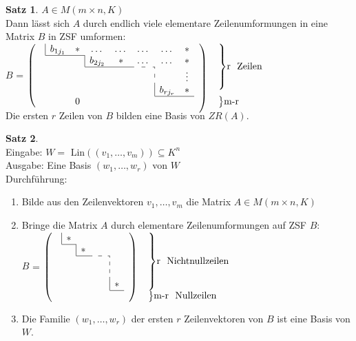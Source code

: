 \documentclass[10pt,a4paper,numbers=endperiod]{scrartcl}
\theoremstyle{definition}
\newtheorem{satz}{Satz}[section]
\begin{document}
\begin{satz}
	$A \in M(m\times n, K)$\\
	Dann lässt sich $A$ durch endlich viele elementare Zeilenumformungen in eine Matrix $B$ in ZSF umformen:\\
	$B$ = $\left(
	\begin{array}{cccccccccc}
	&\multicolumn{1}{|c}{b_{1j_1}}&*&\dots&\dots&\dots&\dots&*& \rdelim){6}{1em} &\rdelim\}{4}{1cm}[r \text{ Zeilen}]\\
	\cline{2-3}
	&&&\multicolumn{1}{|c}{b_{2j_2}}&*&\dots&\dots&*&&\\
	\cline{4-5}\cdashline{6-6}
	& & & & & &\multicolumn{1}{:c}{}&\vdots&&\\
	& & & & & &\multicolumn{1}{|c}{b_{rj_r}}&*&&\\
	\cline{7-8}
	& &0& & & &&&& \rdelim\}{1}{1cm}[m-r]\\
	\end{array}\right.$\\
	
	\vspace{\baselineskip}
	Die ersten $r$ Zeilen von $B$ bilden eine Basis von $ZR(A)$. 
\end{satz}
\newpage
\begin{satz}
	$ $ \\
	Eingabe: $W= \text{ Lin}((v_1,\ldots,v_m))\subseteq K^n$\\
	Ausgabe: Eine Basis $(w_1,\ldots,w_r)$ von $W$\\
	Durchführung: \begin{enumerate}
		\item Bilde aus den Zeilenvektoren $v_1,\ldots,v_m$ die Matrix $A \in M(m\times n,K)$
		\item Bringe die Matrix $A$ durch elementare Zeilenumformungen auf ZSF $B$: \\
		$B$ = $\left(
		\begin{array}{cccccccc}
		&\multicolumn{1}{|c}{*}&&&&& \rdelim){6}{1em} &\rdelim\}{5}{1cm}[r \text{ Nichtnullzeilen}]\\
		\cline{2-2}
		&&\multicolumn{1}{|c}{*}&&&&&\\
		\cline{3-3}\cdashline{4-5}
		& & &&&\multicolumn{1}{:c}{}&&\\
		& & &&&\multicolumn{1}{:c}{}&&\\
		& & & && \multicolumn{1}{|c}{*}&&\\
		\cline{6-6}
		& & & & && &\rdelim\}{1}{1cm}[m-r \text{ Nullzeilen}]\\
		\end{array}\right.$\\
		\item Die Familie $(w_1,\ldots,w_r)$ der ersten $r$ Zeilenvektoren von $B$ ist eine Basis von $W$.
	\end{enumerate}
\end{satz}
\end{document}

